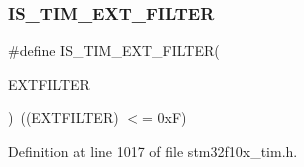 \subsubsection{\texorpdfstring{I\+S\+\_\+\+T\+I\+M\+\_\+\+E\+X\+T\+\_\+\+F\+I\+L\+T\+ER}{IS\_TIM\_EXT\_FILTER}}
{\footnotesize\ttfamily \#define I\+S\+\_\+\+T\+I\+M\+\_\+\+E\+X\+T\+\_\+\+F\+I\+L\+T\+ER(\begin{DoxyParamCaption}\item[{}]{E\+X\+T\+F\+I\+L\+T\+ER }\end{DoxyParamCaption})~((E\+X\+T\+F\+I\+L\+T\+ER) $<$= 0x\+F)}



Definition at line 1017 of file stm32f10x\+\_\+tim.\+h.

